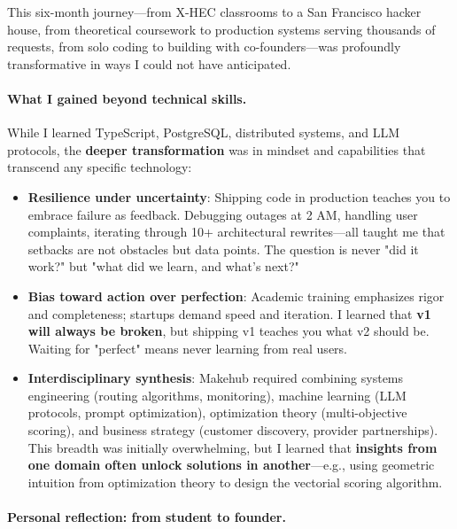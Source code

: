 \documentclass[english]{article}
\begin{document}
This six-month journey—from X-HEC classrooms to a San Francisco hacker house, from theoretical coursework to production systems serving thousands of requests, from solo coding to building with co-founders—was profoundly transformative in ways I could not have anticipated.

\paragraph{What I gained beyond technical skills.}

While I learned TypeScript, PostgreSQL, distributed systems, and LLM protocols, the \textbf{deeper transformation} was in mindset and capabilities that transcend any specific technology:

\begin{itemize}
    \item \textbf{Resilience under uncertainty}: Shipping code in production teaches you to embrace failure as feedback. Debugging outages at 2 AM, handling user complaints, iterating through 10+ architectural rewrites—all taught me that setbacks are not obstacles but data points. The question is never "did it work?" but "what did we learn, and what's next?"

    \item \textbf{Bias toward action over perfection}: Academic training emphasizes rigor and completeness; startups demand speed and iteration. I learned that \textbf{v1 will always be broken}, but shipping v1 teaches you what v2 should be. Waiting for "perfect" means never learning from real users.

    \item \textbf{Interdisciplinary synthesis}: Makehub required combining systems engineering (routing algorithms, monitoring), machine learning (LLM protocols, prompt optimization), optimization theory (multi-objective scoring), and business strategy (customer discovery, provider partnerships). This breadth was initially overwhelming, but I learned that \textbf{insights from one domain often unlock solutions in another}—e.g., using geometric intuition from optimization theory to design the vectorial scoring algorithm.

\end{itemize}

\paragraph{Personal reflection: from student to founder.}
\end{document}
